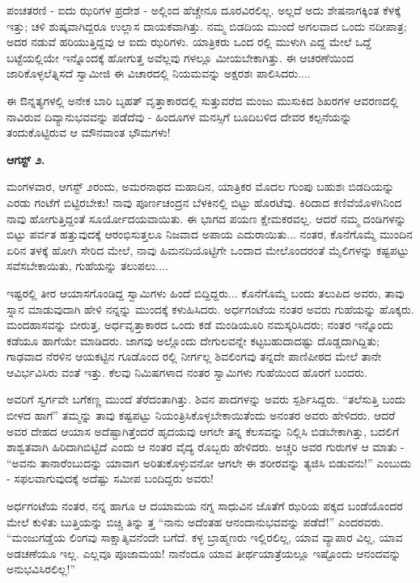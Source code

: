 ಪಂಚತರಣಿ - ಐದು ಝರಿಗಳ ಪ್ರದೇಶ - ಅಲ್ಲಿಂದ ಹೆಚ್ಚೇನೂ ದೂರವಿರಲಿಲ್ಲ. ಅಲ್ಲದೆ ಅದು ಶೇಷನಾಗಕ್ಕಿಂತ ಕೆಳಕ್ಕೆ ಇತ್ತು; ಚಳಿ ಶುಷ್ಕವಾಗಿದ್ದರೂ ಉಲ್ಲಾಸ ದಾಯಕವಾಗಿತ್ತು. ನಮ್ಮ ಬಿಡದಿಯ ಮುಂದೆ ಅಗಲವಾದ ಒಂದು ನದೀಪಾತ್ರ; ಅದರ ನಡುವೆ ಹರಿಯುತ್ತಿದ್ದವು ಆ ಐದು ಝರಿಗಳು. ಯಾತ್ರಿಕರು ಒಂದ ರಲ್ಲಿ ಮುಳುಗಿ ಎದ್ದ ಮೇಲೆ ಒದ್ದೆ ಬಟ್ಟೆಯಲ್ಲಿಯೇ ಇನ್ನೊಂದಕ್ಕೆ ಹೋಗುತ್ತ ಅವೆಲ್ಲವು ಗಳಲ್ಲೂ ಮೀಯಬೇಕಾಗಿತ್ತು. ಈ ಆಚರಣೆಯಿಂದ ಜಾರಿಕೊಳ್ಳಲೆತ್ನಿಸದೆ ಸ್ವಾಮೀಜಿ ಈ ವಿಚಾರದಲ್ಲಿ ನಿಯಮವನ್ನು ಅಕ್ಷರಶಃ ಪಾಲಿಸಿದರು....

ಈ ಔನ್ನತ್ಯಗಳಲ್ಲಿ ಅನೇಕ ಬಾರಿ ಬೃಹತ್ ವೃತ್ತಾಕಾರದಲ್ಲಿ ಸುತ್ತುವರೆದ ಮಂಜು ಮುಸುಕಿದ ಶಿಖರಗಳ ಆವರಣದಲ್ಲಿ ನಾವಿರುವ ದಿವ್ಯಾನುಭವವನ್ನು ಪಡೆದೆವು - ಹಿಂದೂಗಳ ಮನಸ್ಸಿಗೆ ಬೂದಿಬಳಿದ ದೇವರ ಕಲ್ಪನೆಯನ್ನು ತಂದುಕೊಟ್ಟಿರುವ ಆ ಮೌನವಾಂತ ಭೌಮಗಳು!

\textbf{ಆಗಸ್ಟ್ ೨.}

ಮಂಗಳವಾರ, ಆಗಸ್ಟ್ ೨ರಂದು, ಅಮರನಾಥದ ಮಹಾದಿನ, ಯಾತ್ರಿಕರ ಮೊದಲ ಗುಂಪು ಬಹುಶಃ ಬಿಡದಿಯನ್ನು ಎರಡು ಗಂಟೆಗೆ ಬಿಟ್ಟಿರಬೇಕು! ನಾವು ಪೂರ್ಣಚಂದ್ರನ ಬೆಳಕಿನಲ್ಲಿ ಬಿಟ್ಟು ಹೊರಟೆವು. ಕಿರಿದಾದ ಕಣಿವೆಯೊಳಗಿನಿಂದ ನಾವು ಹೋಗುತ್ತಿದ್ದಂತೆ ಸೂರ್ಯೋದಯವಾಯಿತು. ಈ ಭಾಗದ ಪಯಣ ಕ್ಷೇಮಕರವಲ್ಲ. ಆದರೆ ನಮ್ಮ ದಂಡಿಗಳನ್ನು ಬಿಟ್ಟು ಪರ್ವತ ಹತ್ತುವುದಕ್ಕೆ ಆರಂಭಿಸುತ್ತಲೂ ನಿಜವಾದ ಅಪಾಯ ಎದುರಾಯಿತು... ನಂತರ, ಕೊನೆಗೊಮ್ಮೆ ಮುಂದಿನ ಏರಿನ ತಳಕ್ಕೆ ಹೋಗಿ ಸೇರಿದ ಮೇಲೆ, ನಾವು ಹಿಮನದಿಯೊಟ್ಟಿಗೇ ಒಂದಾದ ಮೇಲೊಂದರಂತೆ ಮೈಲಿಗಳನ್ನು ಕಷ್ಟಪಟ್ಟು ಸವೆಸಬೇಕಾಯಿತು, ಗುಹೆಯನ್ನು ತಲುಪಲು....

ಇಷ್ಟರಲ್ಲಿ ತೀರ ಆಯಾಸಗೊಂಡಿದ್ದ ಸ್ವಾಮಿಗಳು ಹಿಂದೆ ಬಿದ್ದಿದ್ದರು... ಕೊನೆಗೊಮ್ಮೆ ಬಂದು ತಲುಪಿದ ಅವರು, ತಾವು ಸ್ನಾನ ಮಾಡುವುದಾಗಿ ಹೇಳಿ ನನ್ನನ್ನು ಮುಂದಕ್ಕೆ ಕಳುಹಿಸಿದರು. ಅರ್ಧಗಂಟೆಯ ನಂತರ ಅವರು ಗುಹೆಯನ್ನು ಹೊಕ್ಕರು. ಮಂದಹಾಸವನ್ನು ಬೀರುತ್ತ, ಅರ್ಧವೃತ್ತಾಕಾರದ ಒಂದು ಕಡೆ ಮಂಡಿಯೂರಿ ನಮಸ್ಕರಿಸಿದರು; ನಂತರ ಇನ್ನೊಂದು ಕಡೆಯೂ ಹಾಗೆಯೇ ಮಾಡಿದರು. ಜಾಗವು ಅಲ್ಲೊಂದು ದೇಗುಲವನ್ನೇ ಕಟ್ಟಬಹುದಾದಷ್ಟು ದೊಡ್ಡದಾಗಿದ್ದಿತು; ಗಾಢವಾದ ನೆರಳಿನ ಆಯಕಟ್ಟಿನ ಗೂಡೊಂದ ರಲ್ಲಿ ನೀರ್ಗಲ್ಲ ಶಿವಲಿಂಗವು ತನ್ನದೇ ಪಾಣಿಪೀಠದ ಮೇಲೆ ತಾನೇ ಆವಿರ್ಭವಿಸಿರು ವಂತೆ ಇತ್ತು. ಕೆಲವು ನಿಮಿಷಗಳಾದ ನಂತರ ಸ್ವಾಮಿಗಳು ಗುಹೆಯಿಂದ ಹೊರಗೆ ಬಂದರು.

ಅವರಿಗೆ ಸ್ವರ್ಗವೇ ಬಗೆಕಣ್ಣ ಮುಂದೆ ತೆರೆದಂತಾಗಿತ್ತು. ಶಿವನ ಪಾದಗಳನ್ನು ಅವರು ಸ್ಪರ್ಶಿಸಿದ್ದರು. “ತಲೆಸುತ್ತಿ ಬಂದು ಬೀಳದ ಹಾಗೆ” ತಮ್ಮನ್ನು ತಾವು ಕಷ್ಟಪಟ್ಟು ನಿಯಂತ್ರಿಸಿಕೊಳ್ಳಬೇಕಾಯಿತೆಂದು ಅನಂತರ ಅವರು ಹೇಳಿದರು. ಆದರೆ ಅವರ ದೇಹದ ಆಯಾಸ ಅದೆಷ್ಟಾಗಿತ್ತೆಂದರೆ ಹೃದಯವು ಆಗಲೇ ತನ್ನ ಕೆಲಸವನ್ನು ನಿಲ್ಲಿಸಿ ಬಿಡಬೇಕಾಗಿತ್ತು, ಬದಲಿಗೆ ಶಾಶ್ವತವಾಗಿ ಹಿರಿದಾಗಿಬಿಟ್ಟಿದೆ ಎಂದು ಆ ನಂತರ ವೈದ್ಯ ರೊಬ್ಬರು ಹೇಳಿದರು. ಅಚ್ಚರಿ ಅವರ ಗುರುಗಳ ಆ ಮಾತು - “ಅವನು ತಾನಾರೆಂಬುದನ್ನು ಯಾವಾಗ ಅರಿತುಕೊಳ್ಳುವನೋ ಆಗಲೇ ಈ ಶರೀರವನ್ನು ತ್ಯಜಿಸಿ ಬಿಡುವನು!” ಎಂಬುದು - ಸಫಲವಾಗುವುದಕ್ಕೆ ಅದೆಷ್ಟು ಸಮೀಪ ಬಂದಿದ್ದರು ಅವರು!

ಅರ್ಧಗಂಟೆಯ ನಂತರ, ನನ್ನ ಹಾಗೂ ಆ ದಯಾಮಯ ನಗ್ನ ಸಾಧುವಿನ ಜೊತೆಗೆ ಝರಿಯ ಪಕ್ಕದ ಬಂಡೆಯೊಂದರ ಮೇಲೆ ಕುಳಿತು ಬುತ್ತಿಯನ್ನು ಬಿಚ್ಚಿ ತಿನ್ನು ತ್ತ “ನಾನು ಅದೆಂತಹ ಆನಂದಾನುಭವವನ್ನು ಪಡೆದೆ!” ಎಂದರವರು. “ಮಂಜುಗಡ್ಡೆಯ ಲಿಂಗವು ಸಾಕ್ಷಾತ್ಶಿವನೆಂದೇ ಬಗೆದೆ. ಕಳ್ಳ ಬ್ರಾಹ್ಮಣರು ಇಲ್ಲಿರಲಿಲ್ಲ, ಯಾವ ವ್ಯಾಪಾರ ವಿಲ್ಲ, ಯಾವ ಅಡಚಣೆಯೂ ಇಲ್ಲ. ಎಲ್ಲವೂ ಪೂಜಾಮಯ! ನಾನೆಂದೂ ಯಾವ ತೀರ್ಥಯಾತ್ರೆಯಲ್ಲೂ ಇಷ್ಟೊಂದು ಆನಂದವನ್ನು ಅನುಭವಿಸಿರಲಿಲ್ಲ!”

